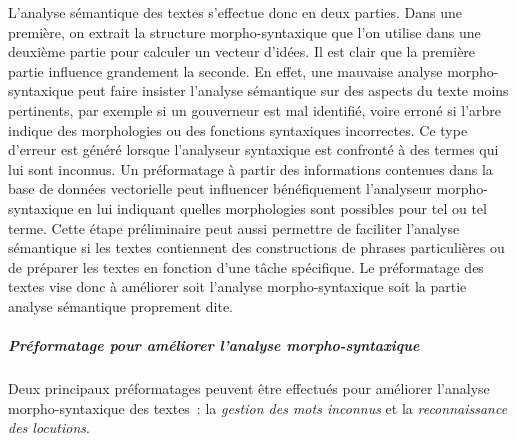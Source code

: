 L'analyse sémantique des textes s'effectue donc en deux parties.  Dans
une première, on extrait la structure morpho-syntaxique que l'on
utilise dans une deuxième partie pour calculer un vecteur
d'idées. Il est clair que la première partie
influence grandement la seconde. En effet, une mauvaise analyse
morpho-syntaxique peut faire insister l'analyse sémantique sur des
aspects du texte moins pertinents, par exemple si un gouverneur est
mal identifié, voire erroné si l'arbre indique des morphologies ou des
fonctions syntaxiques incorrectes. Ce type d'erreur est généré lorsque
l'analyseur syntaxique est confronté à des termes qui lui sont
inconnus. Un préformatage à partir des informations contenues dans la
base de données vectorielle peut influencer bénéfiquement l'analyseur
morpho-syntaxique en lui indiquant quelles morphologies sont possibles
pour tel ou tel terme.  Cette étape préliminaire peut aussi permettre
de faciliter l'analyse sémantique si les textes contiennent des
constructions de phrases particulières ou de préparer les textes en
fonction d'une tâche spécifique. Le préformatage des textes vise donc
à améliorer soit l'analyse morpho-syntaxique soit la partie analyse
sémantique proprement dite.

\subparagraph{Préformatage pour améliorer l'analyse
  morpho-syntaxique}

Deux principaux préformatages peuvent être effectués pour améliorer
l'analyse morpho-syntaxique des textes~: la \emph{gestion des mots
  inconnus} et la \emph{reconnaissance des locutions}.

